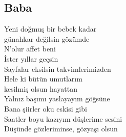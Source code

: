 \subsection{Baba}

Yeni doğmuş bir bebek kadar \\
günahkar değilsin gözümde \\
N'olur affet beni \\
İster yıllar geçsin \\
Sayfalar eksilsin takvimlerimizden \\
Hele ki bütün umutlarım \\
kesilmiş olsun hayattan \\
Yalnız başımı yaslayayım göğsüne \\
Bana şiirler oku eskisi gibi \\
Saatler boyu kazıyım düşlerime sesini \\
Düşünde gözleriminse, gözyaşı olsun \\